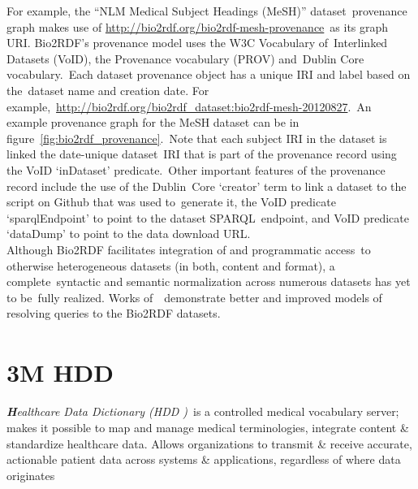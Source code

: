 \documentclass[DIV=calc, paper=a4, fontsize=12pt, onecolumn]{scrartcl}	 %
\newcommand{\initial}[1]{ %
\lettrine[lines=3,lhang=0.3,nindent=0em,slope=0em]{
\color{DarkBlue}
{\textbf{\textit{#1}}}}{}}
\begin{document}
  \noindent For example, the ``NLM Medical Subject Headings (MeSH)'' dataset\
  provenance graph makes use of \url{http://bio2rdf.org/bio2rdf-mesh-provenance}\
  as its graph URI. Bio2RDF's provenance model uses the W3C Vocabulary of\
  Interlinked Datasets (VoID), the Provenance vocabulary (PROV) and\
  Dublin Core vocabulary.\
  Each dataset provenance object has a unique IRI and label based on the\
  dataset name and creation date. For example,\
  \url{http://bio2rdf.org/bio2rdf_dataset:bio2rdf-mesh-20120827}.\
  An example provenance graph for the MeSH dataset can be in figure~\ref{fig:bio2rdf_provenance}.\
  Note that each subject IRI in the dataset is linked the date-unique dataset\
  IRI that is part of the provenance record using the VoID `inDataset' predicate.\
  Other important features of the provenance record include the use of the Dublin\
  Core `creator' term to link a dataset to the script on Github that was used to\
  generate it, the VoID predicate `sparqlEndpoint' to point to the dataset SPARQL\
  endpoint, and VoID predicate `dataDump' to point to the data download URL.\\
  
  \noindent Although Bio2RDF facilitates integration of and programmatic access\
  to otherwise heterogeneous datasets (in both, content and format), a complete\
  syntactic and semantic normalization across numerous datasets has yet to be\
  fully realized. Works of~\cite{ansell_model_2011, callahan_ontology-based_2013}\
  demonstrate better and improved models of resolving queries to the Bio2RDF datasets.\\


\section[3M\textsuperscript{\texttrademark} Healthcare Data Dictionary (HDD)]
{3M HDD\textsuperscript{\texttrademark}}
  \label{sec:hdd}
  
  \initial{H}\textit{ealthcare Data Dictionary (HDD )}\
 is a controlled medical vocabulary server; makes it possible to map and manage medical terminologies, integrate content \& standardize healthcare data. Allows organizations to transmit \& receive accurate, actionable patient data across systems \& applications, regardless of where data originates%
  
\end{document}
